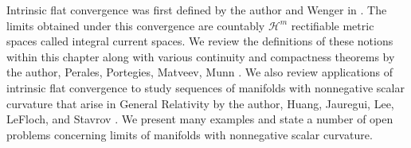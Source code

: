 \documentclass[12pt]{amsart}
\begin{document}
Intrinsic flat convergence was first defined by the author and Wenger in \cite{SorWen2}.  The limits 
obtained under this convergence are countably $\mathcal{H}^m$ rectifiable metric spaces called integral current spaces.   We review the definitions of these notions
within this chapter along with various continuity and
compactness theorems by the author, Perales, Portegies, Matveev, Munn
\cite{Sormani-properties}\cite{Perales-Vol}\cite{Perales-Conv}
\cite{Matveev-Portegies}\cite{Munn-F=GH}.   We also review applications of
intrinsic flat convergence to study sequences of manifolds with
nonnegative scalar curvature that arise in General Relativity by the author,
Huang, Jauregui, Lee, LeFloch, and Stavrov 
\cite{Jauregui} \cite{LeeSormani1}\cite{LeFloch-Sormani-1}
\cite{HLS}\cite{Sormani-Stavrov-1}.   We present many examples and state a number of open problems concerning limits of manifolds with
nonnegative scalar curvature.
\end{document}

